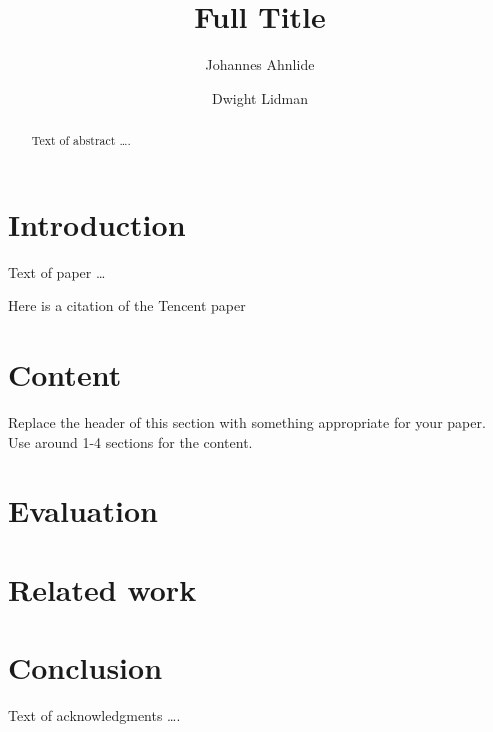 \documentclass[sigplan,10pt]{acmart}
\begin{document}
\title[Short Title]{Full Title}         %



\author{Johannes Ahnlide}

\author{Dwight Lidman}


\begin{abstract}
Text of abstract \ldots.
\end{abstract}


\maketitle


\section{Introduction}

Text of paper \ldots

Here is a citation of the Tencent paper~\cite{YangThe2017}

\lipsum[1-3] %

\section{Content}
Replace the header of this section with something appropriate for your paper. Use around 1-4 sections for the content.

\lipsum[4-10] %


\section{Evaluation}

\lipsum[11-13] %


\section{Related work}

\lipsum[14-15] %

\section{Conclusion}

\lipsum[16-17] %

\begin{acks}
Text of acknowledgments \ldots.
\end{acks}



\end{document}
